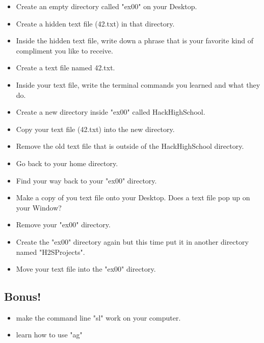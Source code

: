 \documentclass{42-en}
\begin{document}
\begin{itemize}

	\item Create an empty directory called "ex00" on your Desktop.
	\item Create a hidden text file (42.txt) in that directory.
	\item Inside the hidden text file, write down a phrase that is your favorite kind of compliment you like to receive.
	\item Create a text file named 42.txt.
	\item Inside your text file, write the terminal commands you learned and what they do.
	\item Create a new directory inside "ex00" called HackHighSchool.
	\item Copy your text file (42.txt) into the new directory.
	\item Remove the old text file that is outside of the HackHighSchool directory.
	\item Go back to your home directory.
	\item Find your way back to your "ex00" directory.
	\item Make a copy of you text file onto your Desktop. Does a text file pop up on your Window?
	\item Remove your "ex00" directory.
	\item Create the "ex00" directory again but this time put it in another directory named "H2SProjects".
	\item Move your text file into the "ex00" directory.\\

\end{itemize}


\subsection{Bonus!}
\begin{itemize}

	\item make the command line "sl" work on your computer.
	\item learn how to use "ag"

\end{itemize}


\end{document}
